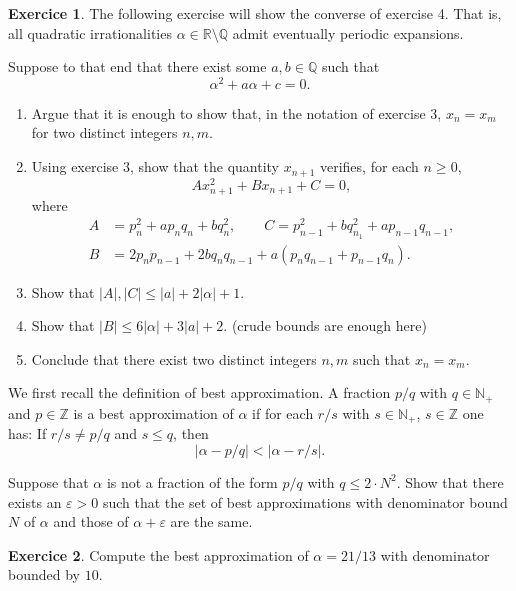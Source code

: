 \documentclass[12pt,a4paper]{article}
\theoremstyle{plain}
\newtheorem*{Sol*}{Solution}
\theoremstyle{definition}
\newtheorem{Ex}{Exercice}
\def \Q {\mathbb Q}
\def \R {\mathbb R}
\newif\ifsolutions
\newcommand{\exercise}[2]{
			\begin{Ex} #1 \end{Ex}
			\ifsolutions  \begin{Sol*} #2 \end{Sol*} \bigskip \else \bigskip  \fi
		}
\begin{document}
\exercise{
	The following exercise will show the converse of exercise 4.
	That is, all quadratic irrationalities $\alpha \in \R\setminus\Q$ admit eventually periodic expansions.
	
	Suppose to that end that there exist some $a, b \in \Q$ such that
		\[ \alpha^2 + a \alpha + c = 0. \]

	\begin{enumerate}
		\item Argue that it is enough to show that, in the notation of exercise 3, $x_n = x_m$ for two distinct integers $n, m$.
		\item Using exercise 3, show that the quantity $x_{n+1}$ verifies, for each $n\geq0$,
			\[ Ax_{n+1}^2 + Bx_{n+1} + C = 0, \]
		where
			\begin{align*}
			 A &= p_n^2 + a p_n q_n + b q_n^2,
			\qquad C = p_{n-1}^2 + b q_{n_1}^2 + a p_{n-1}q_{n-1},\\
			 B &= 2p_n p_{n-1} + 2b q_n q_{n-1} + a(p_n q_{n-1} + p_{n-1}q_{n}).
			\end{align*}
		\item Show that $|A|, |C| \leq |a| + 2|\alpha|+1$.
		\item Show that $|B| \leq 6|\alpha| + 3|a| + 2$. (crude bounds are enough here)
		\item Conclude that there exist two distinct integers $n, m$ such that $x_n = x_m$.
	\end{enumerate}
}


\exercise{
  We first recall the definition of best approximation. A fraction $p/q$  with $q ∈ ℕ_+$ and $p ∈ℤ$ is a best approximation of $α$ if for each $r/s$ with $s ∈ ℕ_+$, $s∈ ℤ$ one has: If $r/s ≠ p/q$ and $s ≤ q$, then
  \begin{displaymath}
    | α - p/q | < |α - r/s|.   
  \end{displaymath}

  Suppose that $α$ is not a fraction of the form $p/q$ with $q≤2 ⋅N^2$. 
  Show that there exists an $ε>0$ such that the set of best approximations with denominator bound $N$ of $α$ and those of  $α +ε$ are the same. 
}{}

\exercise{Compute the best approximation of $α = 21/13$ with denominator bounded by $10$.}{}
\end{document}
